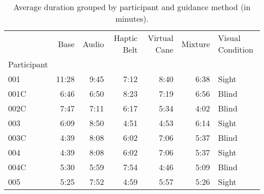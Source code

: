 
\begin{table}[!htb]
\centering
\caption{Average duration grouped by participant and guidance method (in minutes).}
\label{tab:duracao_average_scene}
\begin{tabular}{lrrrrrl}
\toprule
{} &   Base & Audio & Haptic Belt & Virtual Cane & Mixture & Visual Condition \\
Participant &        &       &             &              &         &                  \\
\midrule
001         &  11:28 &  9:45 &        7:12 &         8:40 &    6:38 &            Sight \\
001C        &   6:46 &  6:50 &        8:23 &         7:19 &    6:56 &            Blind \\
002C        &   7:47 &  7:11 &        6:17 &         5:34 &    4:02 &            Blind \\
003         &   6:09 &  8:50 &        4:51 &         4:53 &    6:14 &            Sight \\
003C        &   4:39 &  8:08 &        6:02 &         7:06 &    5:37 &            Blind \\
004         &   4:39 &  8:08 &        6:02 &         7:06 &    5:37 &            Sight \\
004C        &   5:30 &  5:59 &        7:54 &         4:46 &    5:09 &            Blind \\
005         &   5:25 &  7:52 &        4:59 &         5:57 &    5:26 &            Sight \\
\bottomrule
\end{tabular}
\end{table}

